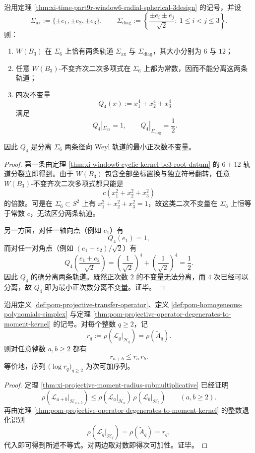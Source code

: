\begin{proposition}\label{prop:xi-time-part9r-window6-radial-minimal-weyl-separator}
沿用定理 \ref{thm:xi-time-part9r-window6-radial-spherical-3design} 的记号，并设
\[
\Sigma_{\mathrm{ax}}:=\{\pm e_1,\pm e_2,\pm e_3\},
\qquad
\Sigma_{\mathrm{diag}}:=
\left\{
\frac{\pm e_i\pm e_j}{\sqrt2}:\ 1\le i<j\le 3
\right\}.
\]
则：
\begin{enumerate}
  \item \(W(B_3)\) 在 \(\Sigma_6\) 上恰有两条轨道 \(\Sigma_{\mathrm{ax}}\) 与 \(\Sigma_{\mathrm{diag}}\)，其大小分别为 \(6\) 与 \(12\)；
  \item 任意 \(W(B_3)\)-不变齐次二次多项式在 \(\Sigma_6\) 上都为常数，因而不能分离这两条轨道；
  \item 四次不变量
  \[
  Q_4(x):=x_1^4+x_2^4+x_3^4
  \]
  满足
  \[
  Q_4|_{\Sigma_{\mathrm{ax}}}=1,
  \qquad
  Q_4|_{\Sigma_{\mathrm{diag}}}=\frac12.
  \]
\end{enumerate}
因此 \(Q_4\) 是分离 \(\Sigma_6\) 两条径向 Weyl 轨道的最小正次数不变量。
\end{proposition}
\begin{proof}
第一条由定理 \ref{thm:xi-window6-cyclic-kernel-bc3-root-datum} 的 \(6+12\) 轨道分裂立即得到。由于 \(W(B_3)\) 包含全部坐标置换与独立符号翻转，任意 \(W(B_3)\)-不变齐次二次多项式都只能是
\[
c(x_1^2+x_2^2+x_3^2)
\]
的倍数。可是在 \(\Sigma_6\subset S^2\) 上有 \(x_1^2+x_2^2+x_3^2=1\)，故这类二次不变量在 \(\Sigma_6\) 上恒等于常数 \(c\)，无法区分两条轨道。

另一方面，对任一轴向点（例如 \(e_1\)）有
\[
Q_4(e_1)=1,
\]
而对任一对角点（例如 \((e_1+e_2)/\sqrt2\)）有
\[
Q_4\!\left(\frac{e_1+e_2}{\sqrt2}\right)
=
\left(\frac1{\sqrt2}\right)^4+\left(\frac1{\sqrt2}\right)^4
=
\frac12.
\]
因此 \(Q_4\) 的确分离两条轨道。既然正次数 \(2\) 的不变量无法分离，而 \(4\) 次已经可以分离，故 \(Q_4\) 即为最小正次数分离不变量。证毕。
\end{proof}

\begin{theorem}\label{thm:xi-time-part9r-moment-kernel-radius-submultiplicative}
沿用定义 \ref{def:pom-projective-transfer-operator}、定义 \ref{def:pom-homogeneous-polynomials-simplex} 与定理 \ref{thm:pom-projective-operator-degenerates-to-moment-kernel} 的记号。对每个整数 \(q\ge 2\)，记
\[
r_q:=\rho(\mathcal L_q|_{\mathcal H_q})=\rho(\widetilde A_q).
\]
则对任意整数 \(a,b\ge 2\) 都有
\[
r_{a+b}\le r_a\,r_b.
\]
等价地，序列 \(\bigl(\log r_q\bigr)_{q\ge 2}\) 为次可加序列。
\end{theorem}
\begin{proof}
定理 \ref{thm:xi-projective-moment-radius-submultiplicative} 已经证明
\[
\rho(\mathcal L_{a+b}|_{\mathcal H_{a+b}})
\le
\rho(\mathcal L_a|_{\mathcal H_a})\,
\rho(\mathcal L_b|_{\mathcal H_b})
\qquad(a,b\ge 2).
\]
再由定理 \ref{thm:pom-projective-operator-degenerates-to-moment-kernel} 的整数退化识别
\[
\rho(\mathcal L_q|_{\mathcal H_q})=\rho(\widetilde A_q)=r_q,
\]
代入即可得到所述不等式。对两边取对数即得次可加性。证毕。
\end{proof}

